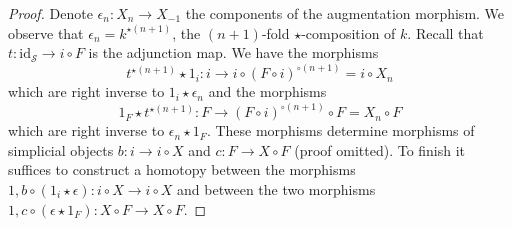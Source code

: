 \begin{proof}
Denote $\epsilon_n : X_n \to X_{-1}$ the components of the augmentation
morphism. We observe that $\epsilon_n = k^{\star (n + 1)}$, the $(n + 1)$-fold
$\star$-composition of $k$.
Recall that $t : \text{id}_\mathcal{S} \to i \circ F$ is the
adjunction map. We have the morphisms
$$
t^{\star (n + 1)} \star 1_i :
i \longrightarrow i \circ (F \circ i)^{\circ (n + 1)} = i \circ X_n
$$
which are right inverse to $1_i \star \epsilon_n$ and the morphisms
$$
1_F \star t^{\star (n + 1)} :
F \longrightarrow (F \circ i)^{\circ (n + 1)} \circ F = X_n \circ F
$$
which are right inverse to $\epsilon_n \star 1_F$. These morphisms
determine morphisms of simplicial objects $b : i \to i \circ X$ and
$c : F \to X \circ F$ (proof omitted).
To finish it suffices to construct a homotopy between the morphisms
$1, b \circ (1_i \star \epsilon) : i \circ X \to i \circ X$
and between the two morphisms
$1, c \circ (\epsilon \star 1_F) : X \circ F \to X \circ F$.


\end{proof}
